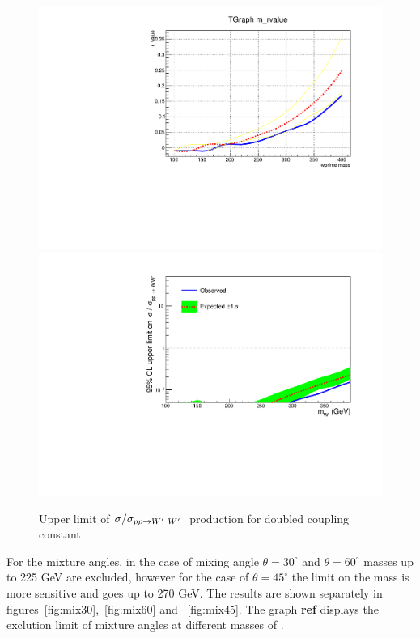 \begin{figure}[!ht]
\centering
\includegraphics*[width=.45\textwidth]{figs/mixtwice.pdf}
\hspace{3mm}
\includegraphics*[width=.45\textwidth]{figs/mixtwiceb.pdf}
\caption{Upper limit of $\sigma/\sigma_{pp \rightarrow W^\prime~ W^\prime~}$ production for doubled coupling constant}
\label{fig:mixtwice}
\end{figure}




For the mixture angles, in the case of mixing angle $\theta=30^\circ$ and $\theta=60^\circ$ masses up to 225 GeV are excluded, however for the case of $\theta=45^\circ$ the limit on the mass is more sensitive and goes up to 270 GeV. The results are shown separately in figures~\ref{fig:mix30},~\ref{fig:mix60} and ~\ref{fig:mix45}. The graph {\bf ref} displays the exclution limit of mixture angles at different masses of \wprime.

